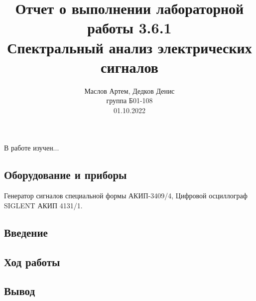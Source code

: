 \documentclass[12pt,a4paper]{article}
\author{\normalsize Маслов Артем, Дедков Денис \\
	\normalsize группа Б01-108 \\
	\normalsize 01.10.2022}
\date{}
\title{
	\large Отчет о выполнении лабораторной работы 3.6.1 \\
	\Large Спектральный анализ электрических сигналов \\ 
	
}
\begin{document}
\maketitle
\subsection*{} В работе изучен...

\subsection*{Оборудование и приборы} Генератор сигналов специальной формы
АКИП-3409/4, Цифровой осциллограф SIGLENT АКИП 4131/1.

\subsection*{Введение}

\subsection*{Ход работы}

\subsection*{Вывод}

	
\end{document}
